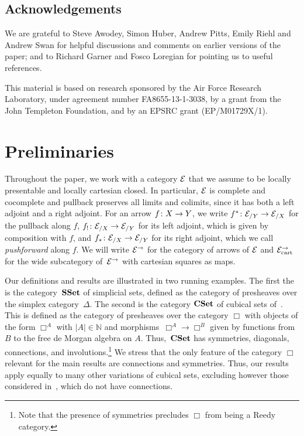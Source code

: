 \documentclass[reqno,10pt,a4paper,oneside,draft]{amsart}
\begin{document}
\subsection*{Acknowledgements}

We are grateful to Steve Awodey, Simon Huber, Andrew Pitts, Emily Riehl and Andrew Swan for helpful discussions and comments on earlier versions of the paper; and to Richard Garner and Fosco Loregian for pointing us to useful references.

This material is based on research sponsored by the Air Force Research Laboratory, under agreement number FA8655-13-1-3038, by a grant from the John Templeton Foundation, and by an EPSRC grant (EP/M01729X/1).


\section{Preliminaries}
\label{sec:fib-and-frob}


Throughout the paper, we work with a category $\cal{E}$ that we assume to be locally presentable and locally cartesian closed. In particular,
$\catE$ is complete and cocomplete and pullback preserves all limits and colimits, since it has both a left 
adjoint and  a right adjoint. For an arrow $f \co X \to Y$, we write $f^* \co \cal{E}_{/Y} \to \cal{E}_{/X}$ for the pullback along $f$, 
$f_{!} \co \cal{E}_{/X} \to \cal{E}_{/Y}$ for its left adjoint, which is given by composition with $f$, and $f_* \co \cal{E}_{/X} \to \cal{E}_{/Y}$
for its right adjoint, which we call \emph{pushforward} along $f$. We will write $\cal{E}^\to$ for the category of arrows of $\cal{E}$
and $\cal{E}^\to_{\mathrm{cart}}$ for the wide subcategory of~$\cal{E}^\to$ with cartesian squares as maps. 

Our definitions and results are illustrated  in two running examples. The first the is the category~$\SSet$ of simplicial sets, defined as the category of 
presheaves over the simplex category~$\Delta$. The second is the category $\CSet$ of cubical sets of~\cite{cohen-et-al:cubicaltt}. This is defined as the category of presheaves over 
the category $\Box$ with objects of the form $\Box^A$ with $|A| \in \mathbb{N}$ and morphisms~$\Box^A \to \Box^B$ given by functions from $B$ to the free de Morgan algebra on $A$. 
Thus,~$\CSet$ has symmetries, diagonals, connections, and involutions.\footnote{Note that the presence of symmetries precludes $\Box$ from being a Reedy category.} We stress that the only feature of the category $\Box$ relevant for the main results  are connections and symmetries.
Thus, our results apply equally to many other variations of cubical sets, excluding however those considered in~\cite{coquand-cubical-sets,huber-thesis}, which do not have connections.
\end{document}
